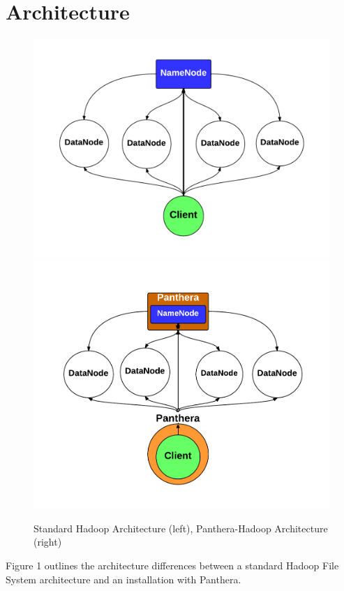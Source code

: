 \documentclass{article}
\begin{document}
\section{Architecture}
\begin{figure}[!h]
  \caption{Standard Hadoop Architecture (left), Panthera-Hadoop Architecture (right)}
  \centering
	\includegraphics[scale=0.4]{assets/hadoop_architecture.pdf}
	\includegraphics[scale=0.4]{assets/panthera_architecture.pdf}
\end{figure}

Figure 1 outlines the architecture differences between a standard Hadoop File System architecture and an installation with Panthera. 
\end{document}
